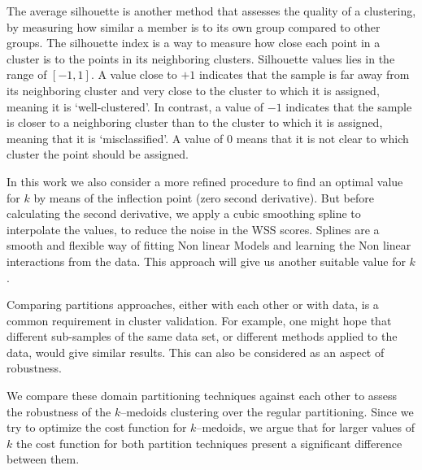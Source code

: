 The average silhouette is another method that assesses the quality of a clustering, by measuring how similar a member is to its own group compared to other groups. The silhouette index is a way to measure how close each point in a cluster is to the points in its neighboring clusters. %
Silhouette values lies in the range of $[-1, 1]$. A value close to $+1$ indicates that the sample is far away from its neighboring cluster and very close to the cluster to which it is assigned, meaning it is `well-clustered'. In contrast, a value of $-1$ indicates that the sample is closer to a neighboring cluster than to the cluster to which it is assigned, meaning that it is `misclassified'. A value of $0$ means that it is not clear to which cluster the point should be assigned. %

In this work we also consider a more refined procedure to find an optimal value for $k$ by means of the inflection point (zero second derivative). But before calculating the second derivative, we apply a cubic smoothing spline to interpolate the values, to reduce the noise in the WSS scores. Splines are a smooth and flexible way of fitting Non linear Models and learning the Non linear interactions from the data. This approach will give us another suitable value for $k$.

Comparing partitions approaches, either with each other or with data, is a common requirement in cluster validation. For example, one might hope that different sub-samples of the same data set, or different methods applied to the data, would give similar results. This can also be considered as an aspect of robustness.

We compare these domain partitioning techniques against each other to assess the robustness of the $k$--medoids clustering over the regular partitioning. Since we try to optimize the cost function for $k$--medoids, we argue that for larger values of $k$ the cost function for both partition techniques present a significant difference between them. %


